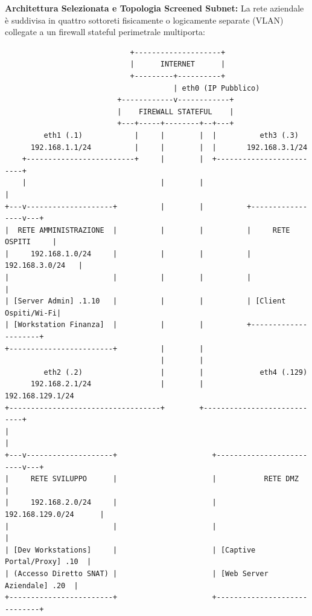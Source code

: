 \documentclass[11pt,a4paper]{article}
\begin{document}
\begin{solutionbox}
\textbf{Architettura Selezionata e Topologia Screened Subnet:}
La rete aziendale \`e suddivisa in quattro sottoreti fisicamente o logicamente separate (VLAN) collegate a un firewall stateful perimetrale multiporta:
\begin{center}
\begin{verbatim}
                             +--------------------+
                             |      INTERNET      |
                             +---------+----------+
                                       | eth0 (IP Pubblico)
                          +------------v------------+
                          |    FIREWALL STATEFUL    |
                          +---+-----+--------+--+---+
         eth1 (.1)            |     |        |  |          eth3 (.3)
      192.168.1.1/24          |     |        |  |       192.168.3.1/24
    +-------------------------+     |        |  +-------------------------+
    |                               |        |                            |
+---v--------------------+          |        |          +-----------------v---+
|  RETE AMMINISTRAZIONE  |          |        |          |     RETE OSPITI     |
|     192.168.1.0/24     |          |        |          |    192.168.3.0/24   |
|                        |          |        |          |                     |
| [Server Admin] .1.10   |          |        |          | [Client Ospiti/Wi-Fi|
| [Workstation Finanza]  |          |        |          +---------------------+
+------------------------+          |        |
                                    |        |
         eth2 (.2)                  |        |             eth4 (.129)
      192.168.2.1/24                |        |           192.168.129.1/24
+-----------------------------------+        +----------------------------+
|                                                                         |
+---v--------------------+                      +-------------------------v---+
|     RETE SVILUPPO      |                      |           RETE DMZ          |
|     192.168.2.0/24     |                      |       192.168.129.0/24      |
|                        |                      |                             |
| [Dev Workstations]     |                      | [Captive Portal/Proxy] .10  |
| (Accesso Diretto SNAT) |                      | [Web Server Aziendale] .20  |
+------------------------+                      +-----------------------------+
\end{verbatim}
\end{center}


\end{solutionbox}
\end{document}
